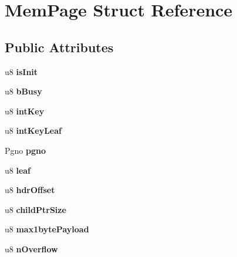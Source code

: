 \hypertarget{struct_mem_page}{}\section{Mem\+Page Struct Reference}
\label{struct_mem_page}
\subsection*{Public Attributes}
\begin{DoxyCompactItemize}
\item 
\mbox{\label{struct_mem_page_a3ab4ace46245be0fb2fb19eaa2862019}} 
u8 {\bfseries is\+Init}
\item 
\mbox{\label{struct_mem_page_a0b7935a6fdec1d6d31c4b3952b0461ea}} 
u8 {\bfseries b\+Busy}
\item 
\mbox{\label{struct_mem_page_a46784c3c4708c7a582cff81a29c55323}} 
u8 {\bfseries int\+Key}
\item 
\mbox{\label{struct_mem_page_a7c30c56237c38e0b81842ae2a6bae9d7}} 
u8 {\bfseries int\+Key\+Leaf}
\item 
\mbox{\label{struct_mem_page_ad2b0c532abc799bbcf3b43df4f0b0546}} 
Pgno {\bfseries pgno}
\item 
\mbox{\label{struct_mem_page_af18504bd0a2e7d39d9b485d434af0447}} 
u8 {\bfseries leaf}
\item 
\mbox{\label{struct_mem_page_a01967a1a593980fb71c8ccf3393ae156}} 
u8 {\bfseries hdr\+Offset}
\item 
\mbox{\label{struct_mem_page_aeba10281fc255d9bbc0e31486f8fbd48}} 
u8 {\bfseries child\+Ptr\+Size}
\item 
\mbox{\label{struct_mem_page_a79548547cafb0e6d8549006bdc553f0a}} 
u8 {\bfseries max1byte\+Payload}
\item 
\mbox{\label{struct_mem_page_a3f7fa1a1eba3af840ef887e8ddd6d2cc}} 
u8 {\bfseries n\+Overflow}
\item 

\end{DoxyCompactItemize}
